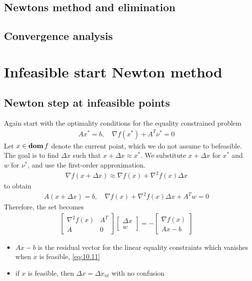 \subsection{Newtons method and elimination}

\subsection{Convergence analysis}

\section{Infeasible start Newton method}

\subsection{Newton step at infeasible points}
Again start with the optimality conditions for the equality constrained problem
\begin{align*}
  Ax^\ast=b,\quad\nabla f(x^\ast)+A^T\nu^\ast=0
\end{align*}
Let $x\in\mathop{\bf dom} f$ denote the current point, which we do not assume to befeasible.
The goal is to find $\Delta x$ such that $x+\Delta x\approx x^\ast$.
We substitute $x+\Delta x$ for $x^\ast$ and $w$ for $\nu^\ast$, and use the first-order approximation.
\begin{align*}
  \nabla f(x+\Delta x)\approx\nabla f(x)+\nabla^2 f(x)\Delta x
\end{align*}
to obtain
\begin{align*}
  A(x+\Delta x)=b,\quad\nabla f(x)+\nabla^2f(x)\Delta x+A^Tw=0
\end{align*}
Therefore, the set becomes
\begin{align}
  \begin{bmatrix}
    \nabla^2f(x)&A^T\\A&0
  \end{bmatrix}
  \begin{bmatrix}
    \Delta x\\w
  \end{bmatrix}=-
  \begin{bmatrix}
    \nabla f(x)\\Ax-b
  \end{bmatrix}\label{eq:10.19}
\end{align}
\begin{itemize}
  \item $Ax-b$ is the residual vector for the linear equality constraints which vanishes when $x$ is feasible, \ie \eqref{eq:10.11}
  \item if $x$ is feasible, then $\Delta x=\Delta x_{nt}$ with no confusion
\end{itemize}

